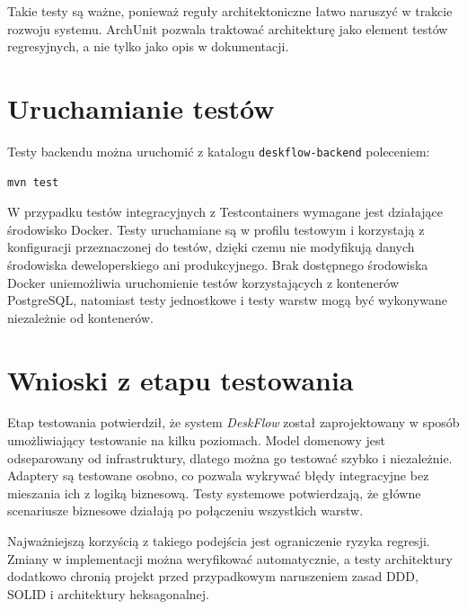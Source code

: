 Takie testy są ważne, ponieważ reguły architektoniczne łatwo naruszyć w trakcie rozwoju systemu. ArchUnit pozwala traktować architekturę jako element testów regresyjnych, a nie tylko jako opis w dokumentacji.

\section{Uruchamianie testów}

Testy backendu można uruchomić z katalogu \texttt{deskflow-backend} poleceniem:

\begin{verbatim}
mvn test
\end{verbatim}

W przypadku testów integracyjnych z Testcontainers wymagane jest działające środowisko Docker. Testy uruchamiane są w profilu testowym i korzystają z konfiguracji przeznaczonej do testów, dzięki czemu nie modyfikują danych środowiska deweloperskiego ani produkcyjnego. Brak dostępnego środowiska Docker uniemożliwia uruchomienie testów korzystających z kontenerów PostgreSQL, natomiast testy jednostkowe i testy warstw mogą być wykonywane niezależnie od kontenerów.

\section{Wnioski z etapu testowania}

Etap testowania potwierdził, że system \textit{DeskFlow} został zaprojektowany w sposób umożliwiający testowanie na kilku poziomach. Model domenowy jest odseparowany od infrastruktury, dlatego można go testować szybko i niezależnie. Adaptery są testowane osobno, co pozwala wykrywać błędy integracyjne bez mieszania ich z logiką biznesową. Testy systemowe potwierdzają, że główne scenariusze biznesowe działają po połączeniu wszystkich warstw.

Najważniejszą korzyścią z takiego podejścia jest ograniczenie ryzyka regresji. Zmiany w implementacji można weryfikować automatycznie, a testy architektury dodatkowo chronią projekt przed przypadkowym naruszeniem zasad DDD, SOLID i architektury heksagonalnej.
